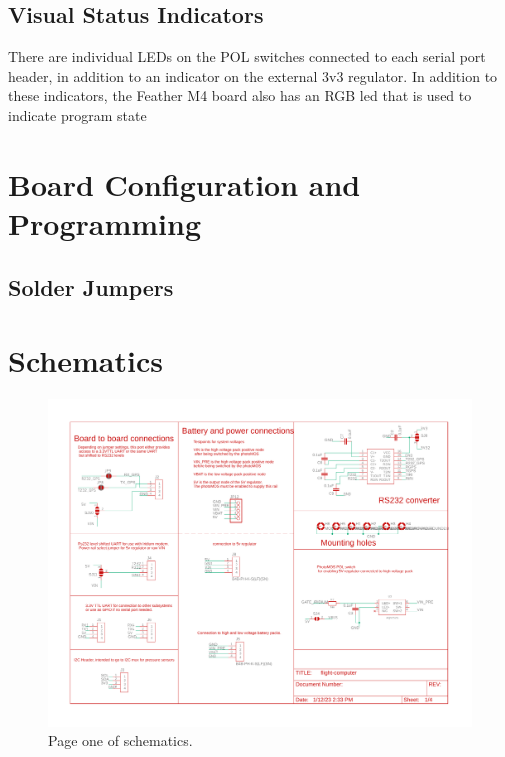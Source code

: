 \documentclass{article}
\begin{document}
\subsection{Visual Status Indicators}
There are individual LEDs on the POL switches connected to each serial port header, in addition to an indicator on the external 3v3 regulator. In addition to these indicators, the Feather M4 board also has an RGB led that is used to indicate program state



\section{Board Configuration and Programming}

\subsection{Solder Jumpers}




\appendix


\section{Schematics}
\label{appa}

\begin{figure}[H]
    \centering
    \includegraphics[width=\textwidth]{images/flight-computer-schematic-page1.pdf}
    \caption{Page one of schematics.}
    \label{fig:page1-2}
\end{figure}
\end{document}
